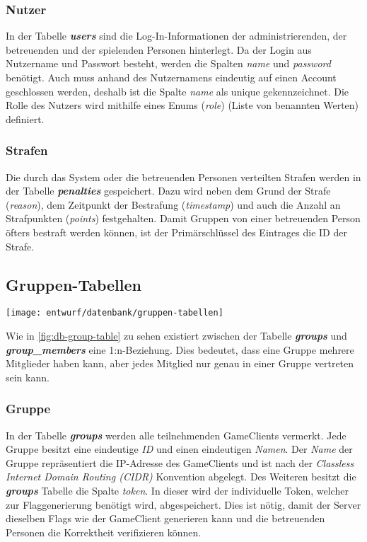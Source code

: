 \subsubsection{Nutzer}
In der Tabelle \textbf{\textit{users}} sind die Log-In-Informationen der administrierenden, der betreuenden und der spielenden Personen hinterlegt. Da der Login aus Nutzername und Passwort besteht, werden die Spalten \textit{name} und \textit{password} benötigt. Auch muss anhand des Nutzernamens eindeutig auf einen Account geschlossen werden, deshalb ist die Spalte \textit{name} als unique gekennzeichnet. Die Rolle des Nutzers wird mithilfe eines Enums (\textit{role}) (Liste von benannten Werten) definiert.

\subsubsection{Strafen}
Die durch das System oder die betreuenden Personen verteilten Strafen werden in der Tabelle \textbf{\textit{penalties}} gespeichert. Dazu wird neben dem Grund der Strafe (\textit{reason}), dem Zeitpunkt der Bestrafung (\textit{timestamp}) und auch die Anzahl an Strafpunkten (\textit{points}) festgehalten. Damit Gruppen von einer betreuenden Person öfters bestraft werden können, ist der Primärschlüssel des Eintrages die ID der Strafe.

\subsection{Gruppen-Tabellen}
\begin{center}
	\texttt{[image: entwurf/datenbank/gruppen-tabellen]}
	\label{fig:db-group-table}
\end{center}

Wie in \autoref{fig:db-group-table} zu sehen existiert zwischen der Tabelle \textbf{\textit{groups}} und \textbf{\textit{group\_members}} eine 1:n-Beziehung. Dies bedeutet, dass eine Gruppe mehrere Mitglieder haben kann, aber jedes Mitglied nur genau in einer Gruppe vertreten sein kann.

\subsubsection{Gruppe}
In der Tabelle \textbf{\textit{groups}} werden alle teilnehmenden GameClients vermerkt. Jede Gruppe besitzt eine eindeutige \textit{ID} und einen eindeutigen \textit{Namen}. Der \textit{Name} der Gruppe repräsentiert die IP-Adresse des GameClients und ist nach der \textit{Classless Internet Domain Routing (CIDR)} Konvention abgelegt. Des Weiteren besitzt die \textbf{\textit{groups}} Tabelle die Spalte \textit{token}. In dieser wird der individuelle Token, welcher zur Flaggenerierung benötigt wird, abgespeichert. Dies ist nötig, damit der Server dieselben Flags wie der GameClient generieren kann und die betreuenden Personen die Korrektheit verifizieren können.

